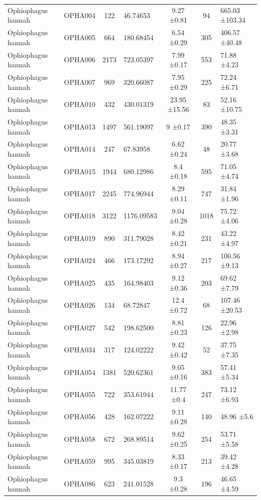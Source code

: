 \documentclass[10pt,a4paper]{article}
\begin{document}
\begin{table}
{\begin{tabular}[t]{lcclccl}
Ophiophagus hannah & OPHA004 & 122 & 46.74653 & 9.27 ±0.81 & 94 & 665.03 ±103.34\\
Ophiophagus hannah & OPHA005 & 664 & 180.68454 & 6.54 ±0.29 & 305 & 406.57 ±40.48\\
Ophiophagus hannah & OPHA006 & 2173 & 723.05397 & 7.99 ±0.17 & 553 & 71.88 ±4.23\\
Ophiophagus hannah & OPHA007 & 969 & 320.66087 & 7.95 ±0.29 & 225 & 72.24 ±6.71\\
Ophiophagus hannah & OPHA010 & 432 & 430.01319 & 23.95 ±15.56 & 83 & 52.16 ±10.75\\
Ophiophagus hannah & OPHA013 & 1497 & 561.19097 & 9 ±0.17 & 390 & 48.35 ±3.31\\
Ophiophagus hannah & OPHA014 & 247 & 67.83958 & 6.62 ±0.24 & 48 & 20.77 ±3.68\\
Ophiophagus hannah & OPHA015 & 1944 & 680.12986 & 8.4 ±0.18 & 595 & 71.05 ±4.74\\
Ophiophagus hannah & OPHA017 & 2245 & 774.96944 & 8.29 ±0.11 & 747 & 31.84 ±1.96\\
Ophiophagus hannah & OPHA018 & 3122 & 1176.09583 & 9.04 ±0.28 & 1018 & 75.72 ±4.06\\
Ophiophagus hannah & OPHA019 & 890 & 311.79028 & 8.42 ±0.21 & 231 & 43.22 ±4.97\\
Ophiophagus hannah & OPHA024 & 466 & 173.17292 & 8.94 ±0.27 & 217 & 100.56 ±9.13\\
Ophiophagus hannah & OPHA025 & 435 & 164.98403 & 9.12 ±0.36 & 203 & 69.62 ±7.79\\
Ophiophagus hannah & OPHA026 & 134 & 68.72847 & 12.4 ±0.72 & 68 & 107.46 ±20.53\\
Ophiophagus hannah & OPHA027 & 542 & 198.62500 & 8.81 ±0.23 & 126 & 22.96 ±2.98\\
Ophiophagus hannah & OPHA034 & 317 & 124.02222 & 9.42 ±0.42 & 52 & 37.75 ±7.35\\
Ophiophagus hannah & OPHA054 & 1381 & 520.62361 & 9.05 ±0.16 & 383 & 57.41 ±5.34\\
Ophiophagus hannah & OPHA055 & 722 & 353.61944 & 11.77 ±0.4 & 247 & 73.12 ±6.93\\
Ophiophagus hannah & OPHA056 & 428 & 162.07222 & 9.11 ±0.28 & 140 & 48.96 ±5.6\\
Ophiophagus hannah & OPHA058 & 672 & 268.89514 & 9.62 ±0.25 & 254 & 53.71 ±5.58\\
Ophiophagus hannah & OPHA059 & 995 & 345.03819 & 8.33 ±0.17 & 213 & 39.42 ±4.28\\
Ophiophagus hannah & OPHA086 & 623 & 241.01528 & 9.3 ±0.28 & 196 & 46.65 ±4.59\\

\end{tabular}}
\end{table}
\end{document}
